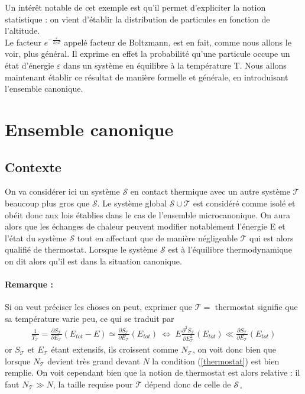 \documentclass[12pt,prb,aps,epsf]{article}
\begin{document}
Un intérêt notable de cet exemple est qu'il permet d'expliciter la notion statistique : on vient d'établir la distribution de particules en fonction de l'altitude.\\
Le facteur $e^{-\frac{\varepsilon}{k_BT}}$ appelé facteur de Boltzmann, est en fait, comme nous allons le voir, plus général. Il exprime en effet la probabilité qu'une particule occupe un état  d'énergie $\varepsilon$ dans un système en équilibre à la température T. Nous allons maintenant établir ce résultat de manière formelle et générale, en introduisant l'ensemble canonique.

\section{Ensemble canonique}
\subsection{Contexte}
 On va considérer ici un système $\mathcal{S}$ en contact thermique avec un autre système $\mathcal{T}$ beaucoup plus gros que $\mathcal{S}$. Le système global $\mathcal{S} \cup \mathcal{T}$ est considéré comme isolé et obéit donc aux lois établies dans le cas de l'ensemble microcanonique. On aura alors que les échanges de chaleur peuvent modifier notablement l'énergie E et l'état du système $\mathcal{S}$ tout en affectant que de manière négligeable $\mathcal{T}$ qui est alors qualifié de thermostat. Lorsque le système $\mathcal{S}$ est à l'équilibre thermodynamique on dit alors qu'il est dans la situation canonique.
 
 \paragraph{Remarque :} Si on veut préciser les choses on peut, exprimer que $\mathcal{T}=$ thermostat signifie que sa température varie peu, ce qui se traduit par
 \begin{eqnarray}
 \frac{1}{T_{\mathcal{T}}} = \frac{\partial S_{\mathcal{T}}}{\partial E_{\mathcal{T}}}(E_{tot}-E) \simeq \frac{\partial S_{\mathcal{T}}}{\partial E_{\mathcal{T}}}(E_{tot})\;
 \Leftrightarrow\; E\frac{\partial^2 S_{\mathcal{T}}}{\partial E_{\mathcal{T}}^2}(E_{tot}) \ll \frac{\partial S_{\mathcal{T}}}{\partial E_{\mathcal{T}}}(E_{tot}) \label{thermostat}
 \end{eqnarray} 
or $S_{\mathcal{T}}$ et $E_{\mathcal{T}}$ étant extensifs, ils croissent comme $N_{\mathcal{T}}$, on voit donc bien que lorsque $N_{\mathcal{T}}$ devient très grand devant $N$ la condition (\ref{thermostat}) est bien remplie. On voit cependant bien que la notion de thermostat est alors relative : il faut $N_{\mathcal{T}} \gg N$, la taille requise pour $\mathcal{T}$ dépend donc de celle de $\mathcal{S}$\,$_{\square}$\\
\end{document}
